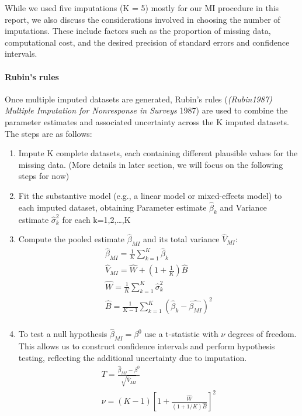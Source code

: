 \documentclass{article}
\begin{document}
While we used five imputations (K = 5) mostly for our MI procedure in
this report, we also discuss the considerations involved in choosing the
number of imputations. These include factors such as the proportion of
missing data, computational cost, and the desired precision of standard
errors and confidence intervals.

\paragraph{Rubin's rules}\label{rubins-rules}

Once multiple imputed datasets are generated, Rubin's rules
(\emph{({Rubin1987}) {Multiple} {Imputation} for {Nonresponse} in
{Surveys}} 1987) are used to combine the parameter estimates and
associated uncertainty across the K imputed datasets. The steps are as
follows:

\begin{enumerate}
\def\labelenumi{\arabic{enumi}.}
\item
  Impute K complete datasets, each containing different plausible values
  for the missing data. (More details in later section, we will focus on
  the following steps for now)
\item
  Fit the substantive model (e.g., a linear model or mixed-effects
  model) to each imputed dataset, obtaining Parameter estimate
  \(\hat{\beta}_{k}\) and Variance estimate \(\hat{\sigma}_{k}^{2}\) for
  each k=1,2,\ldots,K
\item
  Compute the pooled estimate \(\hat{\beta}_{MI}\) and its total
  variance \(\hat{V}_{MI}\): \begin{align*}
    \hat{\beta}_{MI} = \frac{1}{K} \sum_{k=1}^{K}{\hat{\beta}_{k}} \\
    \hat{V}_{MI} = \hat{W} + (1 + \frac{1}{K}) \hat{B} \\
    \hat{W} = \frac{1}{K} \sum^{K}_{k=1}{\hat{\sigma}^{2}_{k}} \\
    \hat{B} = \frac{1}{K-1} \sum^{K}_{k=1}({\hat{\beta}_{k}} - \hat{\beta_{MI}})^{2} \\
    \end{align*}
\item
  To test a null hypothesis \(\hat{\beta}_{MI} = \beta^{0}\) use a
  t-statistic with \(\nu\) degrees of freedom. This allows us to
  construct confidence intervals and perform hypothesis testing,
  reflecting the additional uncertainty due to imputation.
  \begin{align*}
    T = \frac{\hat{\beta}_{MI} - \beta^{0}}  {\sqrt{\hat{V}_{MI}}} \\
    \nu = (K-1)[1 + \frac{\hat{W}}{(1 + 1/K) \hat{B}}]^{2}
    \end{align*}
\end{enumerate}
\end{document}
